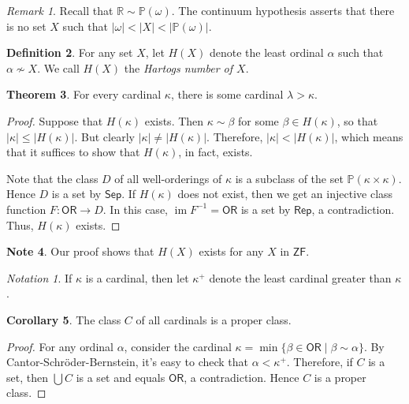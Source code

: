 \documentclass[10pt,letterpaper,cm]{nupset}
\theoremstyle{definition}
\newtheorem{definition}{Definition}[subsection]
\newtheorem{note}[definition]{Note}
\theoremstyle{theorem}
\newtheorem{theorem}[definition]{Theorem}
\newtheorem{corollary}[definition]{Corollary}
\theoremstyle{remark}
\newtheorem{remark}[definition]{Remark}
\newtheorem*{notation}{Notation}
\renewcommand{\P}{\mathbb P}
\newcommand{\R}{\mathbb R}
\newcommand{\1}{\mathbf{1}}
\newcommand{\0}{\vec 0}
\newcommand{\zf}{\mathsf{ZF}}
\newcommand{\ord}{\mathsf{OR}}
\DeclareMathOperator{\im}{im}
\begin{document}
\begin{remark}
Recall that $\R \sim \P(\omega)$. The continuum hypothesis asserts that there is no set $X$ such that $\left\lvert{\omega}\right\rvert < \left\lvert{X}\right\rvert < \left\lvert{\P(\omega)}\right\rvert$.
\end{remark}

\begin{definition}
For any set $X$, let $H(X)$ denote the least ordinal $\alpha$  such that $\alpha \not \sim X$. We call $H(X)$ the \textit{Hartogs number of $X$}. 
\end{definition}


\begin{theorem}
For every cardinal $\kappa$, there is some cardinal $\lambda > \kappa$.
\end{theorem}
\begin{proof}
Suppose that $H(\kappa)$ exists. Then $\kappa \sim \beta$ for some $ \beta \in H(\kappa) $, so that $\left\lvert{\kappa}\right\rvert \leq \left\lvert{H(\kappa)}\right\rvert$. But clearly  $\left\lvert{\kappa}\right\rvert \ne \left\lvert{H(\kappa)}\right\rvert$. Therefore, $\left\lvert{\kappa}\right\rvert < \left\lvert{H(\kappa)}\right\rvert$, which means that it suffices to show that $H(\kappa)$, in fact, exists.

\smallskip
 Note that the class $D$ of all well-orderings of $\kappa$ is a subclass of the set $\P(\kappa \times \kappa)$. Hence $D$ is a set by $\mathsf{Sep}$. If  $H(\kappa)$ does not exist, then we get an injective class function $F: \ord \to D$. In this case, $\im{F^{-1}} = \ord$ is a set by $\mathsf{Rep}$, a contradiction. Thus, $H(\kappa)$ exists. 
\end{proof}

\begin{note}
Our proof shows that $H(X)$ exists for any $X$ in $\zf$.
\end{note}

\begin{notation}
If $\kappa$ is a cardinal, then let $\kappa^+$ denote the least cardinal greater than $\kappa$. 
\end{notation}


\begin{corollary}
The class $C$ of all cardinals is a proper class.
\end{corollary}
\begin{proof}
For any ordinal $\alpha$, consider the cardinal $\kappa = \min\{\beta \in \ord \mid \beta \sim \alpha\}$. By Cantor-Schr\"oder-Bernstein, it's easy to check that $\alpha < \kappa^+$. Therefore,  if $C$ is a set, then $\bigcup{C}$ is a set and equals $\ord$, a contradiction. Hence $C$ is a proper class.
\end{proof}
\end{document}
